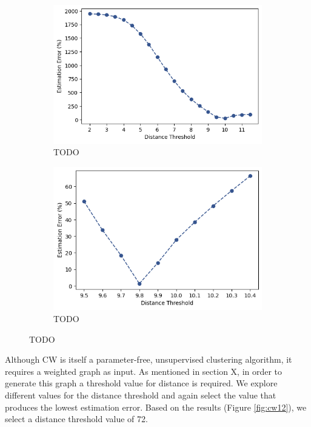 \documentclass[a4paper,12pt]{report}
\begin{document}
	\begin{figure}[ht]
		\begin{subfigure}{.5\textwidth}
			\centering
			\includegraphics[width=.9\linewidth]{images/face/dbscan-parameter-estimation-1.png}  
			\caption{TODO}
			\label{fig:db-sub-first}
		\end{subfigure}
		\begin{subfigure}{.5\textwidth}
			\centering
			\includegraphics[width=.9\linewidth]{images/face/dbscan-parameter-estimation-2.png}  
			\caption{TODO}
			\label{fig:db-sub-second}
		\end{subfigure}
		\caption{TODO}
		\label{fig:db12}
	\end{figure}
	
	Although CW is itself a parameter-free, unsupervised clustering algorithm, it requires a weighted graph as input. As mentioned in section X, in order to generate this graph a threshold value for distance is required. We explore different values for the distance threshold and again select the value that produces the lowest estimation error. Based on the results (Figure \ref{fig:cw12}), we select a distance threshold value of 72.
	
\end{document}
